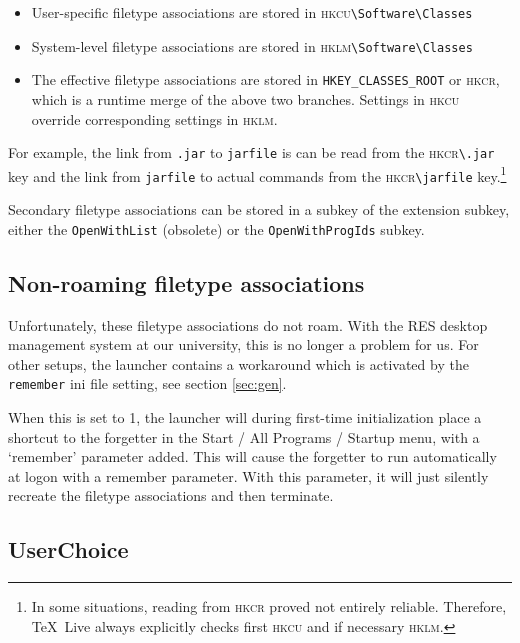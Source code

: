 \documentclass[11pt,a4paper,oneside]{report}
\def\TL{\TeX~Live}
\def\dbr{\discretionary{}{}{}}
\let\bsl\textbackslash
\def\bslb{\bsl\discretionary{}{}{}}
\def\hkcu{\textsc{hkcu}}
\def\hklm{\textsc{hklm}}
\def\hkcr{\textsc{hkcr}}
\begin{document}
{\sloppy
\begin{itemize}
\item User-specific filetype associations are stored in
  \hkcu\texttt{\bslb Software\bslb Classes}
\item System-level filetype associations are stored in
  \hklm\texttt{\bslb Software\bslb Classes}
\item The effective filetype associations are stored in
  \texttt{HKEY\_\dbr CLASSES\_\dbr ROOT} or \hkcr, which is a
  runtime merge of the above two branches. Settings in \hkcu{}
  override corresponding settings in \hklm.
\end{itemize}}

{\sloppy For example, the link from \texttt{.jar} to
  \texttt{jarfile} is can be read from the \hkcr\texttt{\bslb.jar}
  key and the link from \texttt{jarfile} to actual commands from the
  \hkcr \texttt{\bslb jarfile} key.\footnote{In some situations,
    reading from \hkcr{} proved not entirely reliable. Therefore, \TL{}
    always explicitly checks first \hkcu{} and if necessary
    \hklm.}\par}

Secondary filetype associations can be stored in a subkey of the
extension subkey, either the \texttt{OpenWithList} (obsolete) or
the \texttt{OpenWithProgIds} subkey.

\subsection{Non-roaming filetype associations}
\label{sec:noroam}

{\sloppy
Unfortunately, these filetype associations do not roam.  With the
RES desktop management system at our university, this is no longer a
problem for us. For other setups, the launcher contains a workaround
which is activated by the \texttt{remember} ini file setting, see
section \ref{sec:gen}.\par}

When this is set to 1, the launcher will during first-time
initialization place a shortcut to the forgetter in the Start / All
Programs / Startup menu, with a `remember' parameter added. This
will cause the forgetter to run automatically at logon with a
remember parameter. With this parameter, it will just silently
recreate the filetype associations and then terminate.

\subsection{UserChoice}
\label{sec:userchoice}
\end{document}
